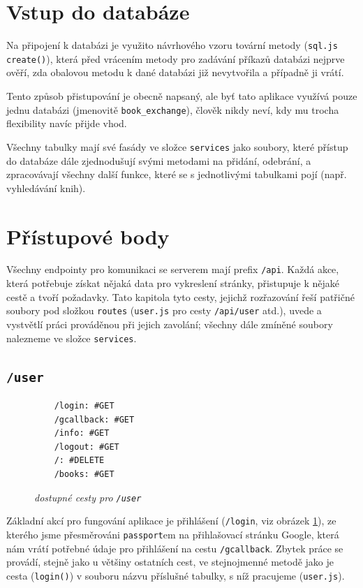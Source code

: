 \documentclass[a4paper,oneside,12pt]{report}
\begin{document}
\section{Vstup do databáze}
Na připojení k databázi je využito návrhového vzoru tovární metody
(\texttt{sql.js create()}), která před vrácením metody pro zadávání příkazů databázi nejprve
ověří, zda obalovou metodu k dané databázi již nevytvořila a případně ji vrátí.

Tento způsob přistupování je obecně napsaný, ale byť tato aplikace využívá pouze jednu
databázi (jmenovitě \texttt{book{\_}exchange}), člověk nikdy neví, kdy mu trocha flexibility
navíc přijde vhod.

Všechny tabulky mají své fasády ve složce \texttt{services} jako soubory, které
přístup do databáze dále zjednodušují svými metodami na přidání, odebrání, a zpracovávají
všechny další funkce, které se s jednotlivými tabulkami pojí (např. vyhledávání knih).

\section{Přístupové body}
Všechny endpointy pro komunikaci se serverem mají prefix \texttt{/api}. Každá
akce, která potřebuje získat nějaká data pro vykreslení stránky, přistupuje k nějaké cestě
a tvoří požadavky. Tato kapitola tyto cesty, jejichž rozřazování řeší patřičné soubory pod
složkou \texttt{routes} (\texttt{user.js} pro cesty \texttt{/api/user}
atd.), uvede a vystvětlí práci prováděnou při jejich zavolání;
všechny dále zmíněné soubory nalezneme ve složce \texttt{services}.

\subsection{\texttt{/user}}
\begin{figure}
	\vspace{-6.5mm}
	\caption{\textit{dostupné cesty pro \texttt{/user}}}\label{fig:/user}
	\vspace{-7mm}
	\begin{verbatim}
	/login: #GET
	/gcallback: #GET
	/info: #GET
	/logout: #GET
	/: #DELETE
	/books: #GET
  \end{verbatim}
\end{figure}

Základní akcí pro fungování aplikace je přihlášení (\texttt{/login}, viz obrázek
\ref{fig:/user}), ze kterého jsme přesměrováni \texttt{passport}em na
přihlašovací stránku Google, která nám vrátí potřebné údaje pro přihlášení na cestu
\texttt{/gcallback}. Zbytek práce se provádí, stejně jako u většiny ostatních cest, ve
stejnojmenné metodě jako je cesta (\texttt{login()}) v souboru názvu příslušné
tabulky, s\,\,níž pracujeme (\texttt{user.js}).
\end{document}
